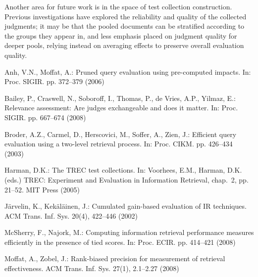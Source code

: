 \documentclass[runningheads,a4paper]{llncs}
\begin{document}
Another area for future work is in the space of test collection
construction.
Previous investigations
{\citep{voorhees00ipm,bcstvy08sigir,sst11sigir}} have explored the
reliability and quality of the collected judgments; it may be that
the pooled documents can be stratified according to the groups they
appear in, and less emphasis placed on judgment quality for deeper
pools, relying instead on averaging effects to preserve overall
evaluation quality.

 


\begin{small}
\renewcommand{\bibsep}{2.5pt}

\begin{thebibliography}{14}
\providecommand{\natexlab}[1]{#1}
\providecommand{\url}[1]{\texttt{#1}}
\providecommand{\urlprefix}{}

Anh, V.N., Moffat, A.: Pruned query evaluation using pre-computed impacts.
\newblock In: Proc. SIGIR. pp. 372--379 (2006)

Bailey, P., Craswell, N., Soboroff, I., Thomas, P., {de V}ries, A.P., Yilmaz,
  E.: Relevance assessment: {A}re judges exchangeable and does it matter.
\newblock In: Proc. SIGIR. pp. 667--674 (2008)

Broder, A.Z., Carmel, D., Herscovici, M., Soffer, A., Zien, J.: Efficient query
  evaluation using a two-level retrieval process.
\newblock In: Proc. CIKM. pp. 426--434 (2003)

Harman, D.K.: The {TREC} test collections.
\newblock In: Voorhees, E.M., Harman, D.K. (eds.) {TREC}: Experiment and
  Evaluation in Information Retrieval, chap.~2, pp. 21--52. MIT Press (2005)

J\"arvelin, K., Kek\"al\"ainen, J.: Cumulated gain-based evaluation of {IR}
  techniques.
\newblock ACM Trans. Inf. Sys. 20(4), 422--446 (2002)

Mc{S}herry, F., Najork, M.: Computing information retrieval performance
  measures efficiently in the presence of tied scores.
\newblock In: Proc. ECIR. pp. 414--421 (2008)

Moffat, A., Zobel, J.: Rank-biased precision for measurement of retrieval
  effectiveness.
\newblock ACM Trans. Inf. Sys. 27(1), 2.1--2.27 (2008)


\end{thebibliography}
\end{small}
\end{document}
